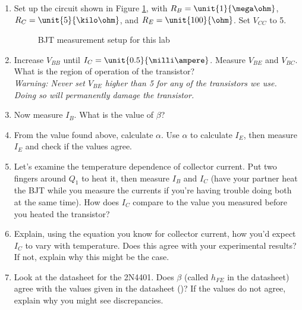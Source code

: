 \documentclass{article}
\begin{document}
\begin{enumerate}
\item Set up the circuit shown in Figure \ref{bjt}, with $R_B = \unit{1}{\mega\ohm}$, $R_C = \unit{5}{\kilo\ohm}$, and $R_E = \unit{100}{\ohm}$. Set $V_{CC}$ to \unit{5}{\volt}.

	\begin{figure}[!htb]
		
		\centerline{\box\graph}
		\caption{BJT measurement setup for this lab}
		\label{bjt}
	\end{figure}

\item Increase $V_{BB}$ until $I_C = \unit{0.5}{\milli\ampere}$. Measure $V_{BE}$ and $V_{BC}$. What is the region of operation of the transistor? \\

\textit{Warning: Never set $V_{BE}$ higher than \unit{5}{\volt} for any of the transistors we use. Doing so will permanently damage the transistor.}

\item Now measure $I_B$. What is the value of $\beta$?

\item From the value found above, calculate $\alpha$. Use $\alpha$ to calculate $I_E$, then measure $I_E$ and check if the values agree.

\item Let's examine the temperature dependence of collector current. Put two fingers around $Q_1$ to heat it, then measure $I_B$ and $I_C$ (have your partner heat the BJT while you measure the currents if you're having trouble doing both at the same time). How does $I_C$ compare to the value you measured before you heated the transistor?

\item Explain, using the equation you know for collector current, how you'd expect $I_C$ to vary with temperature. Does this agree with your experimental results? If not, explain why this might be the case. 

\item Look at the datasheet for the 2N4401. Does $\beta$ (called $h_{FE}$ in the datasheet) agree with the values given in the datasheet ()? If the values do not agree, explain why you might see discrepancies.


\end{enumerate}
\end{document}
